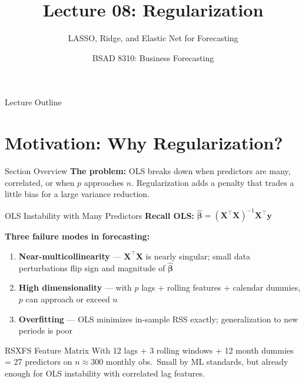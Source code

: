 \documentclass[aspectratio=169, 10pt]{beamer}
\title{Lecture 08: Regularization}
\subtitle{LASSO, Ridge, and Elastic Net for Forecasting}
\author{BSAD 8310: Business Forecasting}
\institute{University of Nebraska at Omaha}
\begin{document}

\begin{frame}
  \titlepage
\end{frame}

\begin{frame}{Lecture Outline}
  \tableofcontents
\end{frame}

\section{Motivation: Why Regularization?}


\begin{frame}{Section Overview}
  \textbf{The problem:} OLS breaks down when predictors are many, correlated,
  or when $p$ approaches $n$. Regularization adds a penalty that trades a
  little bias for a large variance reduction.
\end{frame}

\begin{frame}{OLS Instability with Many Predictors}
  \textbf{Recall OLS:} $\hat{\bm{\beta}} = (\mathbf{X}^\top\mathbf{X})^{-1}\mathbf{X}^\top\mathbf{y}$

  \medskip
  \textbf{Three failure modes in forecasting:}
  \begin{enumerate}
    \item \textbf{Near-multicollinearity} — $\mathbf{X}^\top\mathbf{X}$ is nearly singular;
          small data perturbations flip sign and magnitude of $\hat{\bm{\beta}}$
    \item \textbf{High dimensionality} — with $p$ lags + rolling features + calendar dummies,
          $p$ can approach or exceed $n$
    \item \textbf{Overfitting} — OLS minimizes in-sample RSS exactly;
          generalization to new periods is poor
  \end{enumerate}

  \medskip
  \begin{examplebox}{RSXFS Feature Matrix}
    With 12 lags + 3 rolling windows + 12 month dummies = 27 predictors on
    $n \approx 300$ monthly obs.\ Small by ML standards, but already
    enough for OLS instability with correlated lag features.
  \end{examplebox}
\end{frame}
\end{document}
